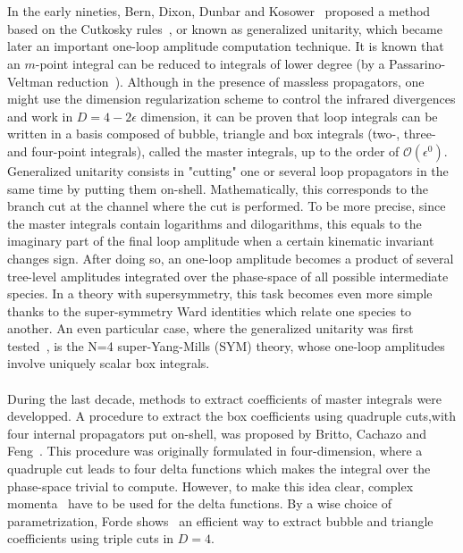 \\\\
In the early nineties, Bern, Dixon, Dunbar and Kosower~\cite{Bern:1994zx} proposed a method based on the Cutkosky rules~\cite{doi:10.1063/1.1703676}, or known as generalized unitarity, which became later an important one-loop amplitude computation technique.
It is known that an $m$-point integral can be reduced to integrals of lower degree (\eg by a Passarino-Veltman reduction~\cite{PASSARINO1979151}).
Although in the presence of massless propagators, one might use the dimension regularization scheme to control the infrared divergences and work in $D = 4-2\epsilon$ dimension, it can be proven that loop integrals can be written in a basis composed of bubble, triangle and box integrals (\ie two-, three- and four-point integrals), called the master integrals, up to the order of $\mathcal{O}(\epsilon^0)$.
Generalized unitarity consists in "cutting" one or several loop propagators in the same time by putting them on-shell.
Mathematically, this corresponds to the branch cut at the channel where the cut is performed. 
To be more precise, since the master integrals contain logarithms and dilogarithms, this equals to the imaginary part of the final loop amplitude when a certain kinematic invariant changes sign.
After doing so, an one-loop amplitude becomes a product of several tree-level amplitudes integrated over the phase-space of all possible intermediate species.
In a theory with supersymmetry, this task becomes even more simple thanks to the super-symmetry Ward identities which relate one species to another.
An even particular case, where the generalized unitarity was first tested~\cite{Bern:1994zx}, is the N=4 super-Yang-Mills (SYM) theory, whose one-loop amplitudes involve uniquely scalar box integrals. 
\\\\
During the last decade, methods to extract coefficients of master integrals were developped. 
A procedure to extract the box coefficients using quadruple cuts,\ie with four internal propagators put on-shell, was proposed by Britto, Cachazo and Feng~\cite{Britto:2004nc}. 
This procedure was originally formulated in four-dimension, where a quadruple cut leads to four delta functions which makes the integral over the phase-space trivial to compute. 
However, to make this idea clear, complex momenta~\cite{PhysRevD.75.025028} have to be used for the delta functions.
By a wise choice of parametrization, Forde shows~\cite{Forde:2007mi} an efficient way to extract bubble and triangle coefficients using triple cuts in $D=4$.
